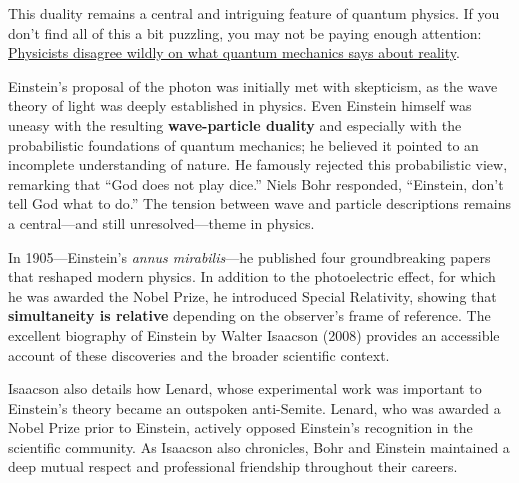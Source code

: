 \documentclass[
  letterpaper,
]{book}
\begin{document}
This duality remains a central and intriguing feature of quantum
physics. If you don't find all of this a bit puzzling, you may not be
paying enough attention:
\href{https://www.nature.com/articles/d41586-025-02342-y?utm_source=Live+Audience&utm_campaign=a8d315930b-nature-briefing-daily-20250730&utm_medium=email&utm_term=0_-33f35e09ea-49658492}{Physicists
disagree wildly on what quantum mechanics says about reality}.

\begin{tcolorbox}[enhanced jigsaw, colframe=quarto-callout-note-color-frame, titlerule=0mm, rightrule=.15mm, opacitybacktitle=0.6, colback=white, leftrule=.75mm, coltitle=black, title=\textcolor{quarto-callout-note-color}{\faInfo}\hspace{0.5em}{Einstein, Bohr, and Lenard}, bottomrule=.15mm, colbacktitle=quarto-callout-note-color!10!white, breakable, left=2mm, bottomtitle=1mm, toptitle=1mm, opacityback=0, arc=.35mm, toprule=.15mm]

Einstein's proposal of the photon was initially met with skepticism, as
the wave theory of light was deeply established in physics. Even
Einstein himself was uneasy with the resulting \textbf{wave-particle
duality} and especially with the probabilistic foundations of quantum
mechanics; he believed it pointed to an incomplete understanding of
nature. He famously rejected this probabilistic view, remarking that
``God does not play dice.'' Niels Bohr responded, ``Einstein, don't tell
God what to do.'' The tension between wave and particle descriptions
remains a central---and still unresolved---theme in physics.

In 1905---Einstein's \emph{annus mirabilis}---he published four
groundbreaking papers that reshaped modern physics. In addition to the
photoelectric effect, for which he was awarded the Nobel Prize, he
introduced Special Relativity, showing that \textbf{simultaneity is
relative} depending on the observer's frame of reference. The excellent
biography of Einstein by Walter Isaacson (2008) provides an accessible
account of these discoveries and the broader scientific context.

Isaacson also details how Lenard, whose experimental work was important
to Einstein's theory became an outspoken anti-Semite. Lenard, who was
awarded a Nobel Prize prior to Einstein, actively opposed Einstein's
recognition in the scientific community. As Isaacson also chronicles,
Bohr and Einstein maintained a deep mutual respect and professional
friendship throughout their careers.

\end{tcolorbox}
\end{document}
